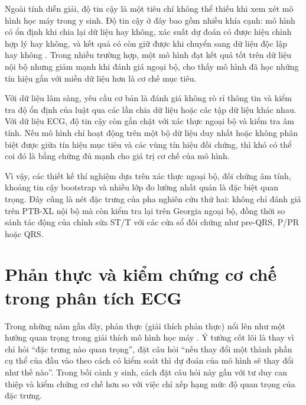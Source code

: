 \blocksep

Ngoài tính diễn giải, độ tin cậy là một tiêu chí không thể thiếu khi xem xét mô hình học máy trong y sinh. Độ tin cậy ở đây bao gồm nhiều khía cạnh: mô hình có ổn định khi chia lại dữ liệu hay không, xác suất dự đoán có được hiệu chỉnh hợp lý hay không, và kết quả có còn giữ được khi chuyển sang dữ liệu độc lập hay không \cite{Guo2017, Quinonero2009}. Trong nhiều trường hợp, một mô hình đạt kết quả tốt trên dữ liệu nội bộ nhưng giảm mạnh khi đánh giá ngoại bộ, cho thấy mô hình đã học những tín hiệu gắn với miền dữ liệu hơn là cơ chế mục tiêu.

\blocksep

Với dữ liệu lâm sàng, yêu cầu cơ bản là đánh giá không rò rỉ thông tin và kiểm tra độ ổn định của luật qua các lần chia dữ liệu hoặc các tập dữ liệu khác nhau. Với dữ liệu ECG, độ tin cậy còn gắn chặt với xác thực ngoại bộ và kiểm tra âm tính. Nếu mô hình chỉ hoạt động trên một bộ dữ liệu duy nhất hoặc không phân biệt được giữa tín hiệu mục tiêu và các vùng tín hiệu đối chứng, thì khó có thể coi đó là bằng chứng đủ mạnh cho giá trị cơ chế của mô hình.

\blocksep

Vì vậy, các thiết kế thí nghiệm dựa trên xác thực ngoại bộ, đối chứng âm tính, khoảng tin cậy bootstrap và nhiều lớp đo lường nhất quán là đặc biệt quan trọng. Đây cũng là nét đặc trưng của pha nghiên cứu thứ hai: không chỉ đánh giá trên PTB-XL nội bộ mà còn kiểm tra lại trên Georgia ngoại bộ, đồng thời so sánh tác động của chỉnh sửa ST/T với các cửa sổ đối chứng như pre-QRS, P/PR hoặc QRS.

\blocksep

\section{Phản thực và kiểm chứng cơ chế trong phân tích ECG}

\blocksep

Trong những năm gần đây, phản thực (giải thích phản thực) nổi lên như một hướng quan trọng trong giải thích mô hình học máy \cite{Wachter2017}. Ý tưởng cốt lõi là thay vì chỉ hỏi “đặc trưng nào quan trọng”, đặt câu hỏi “nếu thay đổi một thành phần cụ thể của đầu vào theo cách có kiểm soát thì dự đoán của mô hình sẽ thay đổi như thế nào”. Trong bối cảnh y sinh, cách đặt câu hỏi này gần với tư duy can thiệp và kiểm chứng cơ chế hơn so với việc chỉ xếp hạng mức độ quan trọng của đặc trưng.

\blocksep

